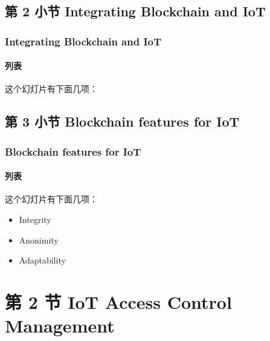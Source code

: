 \documentclass[
    aspectratio=169,                   %
]{beamer}
\begin{document}
\subsection{第 2 小节 Integrating Blockchain and IoT}

    \begin{frame}
        \frametitle{Integrating Blockchain and IoT}

        \paragraph{列表} 这个\alert{幻灯片}有下面几项：

    \end{frame}

\subsection{第 3 小节 Blockchain features for IoT}

    \begin{frame}
        \frametitle{Blockchain features for IoT}

        \paragraph{列表} 这个\alert{幻灯片}有下面几项：

        \begin{itemize}
            \item Integrity
            \item Anonimity
            \item Adaptability
        \end{itemize}

    \end{frame}


        

\section{第 2 节 IoT Access Control Management}
\end{document}
